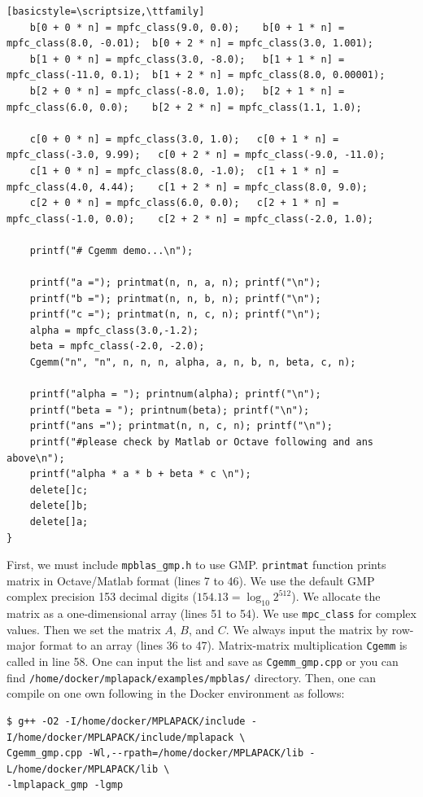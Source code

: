 \documentclass[12pt]{article}
\begin{document}
\begin{lstlisting}[basicstyle=\scriptsize,\ttfamily]
    b[0 + 0 * n] = mpfc_class(9.0, 0.0);    b[0 + 1 * n] = mpfc_class(8.0, -0.01);  b[0 + 2 * n] = mpfc_class(3.0, 1.001);
    b[1 + 0 * n] = mpfc_class(3.0, -8.0);   b[1 + 1 * n] = mpfc_class(-11.0, 0.1);  b[1 + 2 * n] = mpfc_class(8.0, 0.00001);
    b[2 + 0 * n] = mpfc_class(-8.0, 1.0);   b[2 + 1 * n] = mpfc_class(6.0, 0.0);    b[2 + 2 * n] = mpfc_class(1.1, 1.0);

    c[0 + 0 * n] = mpfc_class(3.0, 1.0);   c[0 + 1 * n] = mpfc_class(-3.0, 9.99);   c[0 + 2 * n] = mpfc_class(-9.0, -11.0);
    c[1 + 0 * n] = mpfc_class(8.0, -1.0);  c[1 + 1 * n] = mpfc_class(4.0, 4.44);    c[1 + 2 * n] = mpfc_class(8.0, 9.0);
    c[2 + 0 * n] = mpfc_class(6.0, 0.0);   c[2 + 1 * n] = mpfc_class(-1.0, 0.0);    c[2 + 2 * n] = mpfc_class(-2.0, 1.0);

    printf("# Cgemm demo...\n");

    printf("a ="); printmat(n, n, a, n); printf("\n");
    printf("b ="); printmat(n, n, b, n); printf("\n");
    printf("c ="); printmat(n, n, c, n); printf("\n");
    alpha = mpfc_class(3.0,-1.2);
    beta = mpfc_class(-2.0, -2.0);
    Cgemm("n", "n", n, n, n, alpha, a, n, b, n, beta, c, n);

    printf("alpha = "); printnum(alpha); printf("\n");
    printf("beta = "); printnum(beta); printf("\n");
    printf("ans ="); printmat(n, n, c, n); printf("\n");
    printf("#please check by Matlab or Octave following and ans above\n");
    printf("alpha * a * b + beta * c \n");
    delete[]c;
    delete[]b;
    delete[]a;
}
\end{lstlisting}
First, we must include {\tt mpblas\_gmp.h} to use GMP. {\tt printmat} function prints matrix in Octave/Matlab format (lines 7 to 46).
We use the default GMP complex precision 153 decimal digits ($154.13 = \log_{10} 2^{512}$).
We allocate the matrix as a one-dimensional array (lines 51 to 54). We use {\tt mpc\_class} for complex values.
Then we set the matrix $A$, $B$, and $C$. We always input the matrix by row-major format to an array (lines 36 to 47). Matrix-matrix multiplication {\tt Cgemm} is called in line 58.
One can input the list and save as {\tt Cgemm\_gmp.cpp} or you can find {\tt /home/docker/mplapack/examples/mpblas/} directory.
Then, one can compile on one own following in the Docker environment as follows:
\begin{verbatim}
$ g++ -O2 -I/home/docker/MPLAPACK/include -I/home/docker/MPLAPACK/include/mplapack \
Cgemm_gmp.cpp -Wl,--rpath=/home/docker/MPLAPACK/lib -L/home/docker/MPLAPACK/lib \
-lmplapack_gmp -lgmp
\end{verbatim}
\end{document}
